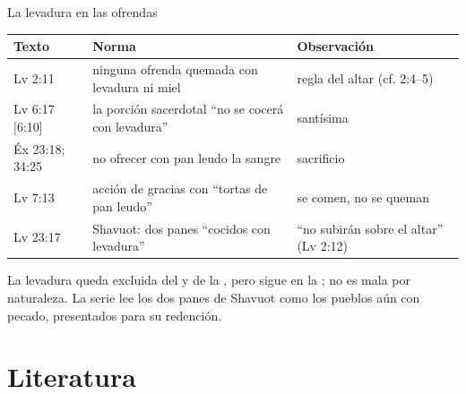 \begin{frame}{La levadura en las ofrendas}
\scriptsize\renewcommand{\arraystretch}{1.13}
\begin{tabular}{@{}L{2.2cm}L{5.0cm}L{4.8cm}@{}}
\toprule
\textbf{Texto} & \textbf{Norma} & \textbf{Observación} \\ \midrule
Lv 2:11 & ninguna ofrenda quemada con levadura ni miel & regla del altar (cf. 2:4--5) \\
Lv 6:17 [6:10] & la porción sacerdotal ``no se cocerá con levadura'' & santísima \\
Éx 23:18; 34:25 & no ofrecer con pan leudo la sangre & sacrificio \\
Lv 7:13 & acción de gracias con ``tortas de pan leudo'' & se comen, no se queman \\
Lv 23:17 & Shavuot: dos panes ``cocidos con levadura'' & ``no subirán sobre el altar'' (Lv 2:12) \\
\bottomrule
\end{tabular}\par\medskip
\small La levadura queda excluida del  y de la , pero sigue en la ; no es mala por naturaleza. La serie lee los dos panes de Shavuot como los pueblos aún con pecado, presentados para su redención.
\end{frame}

\section{Literatura}

